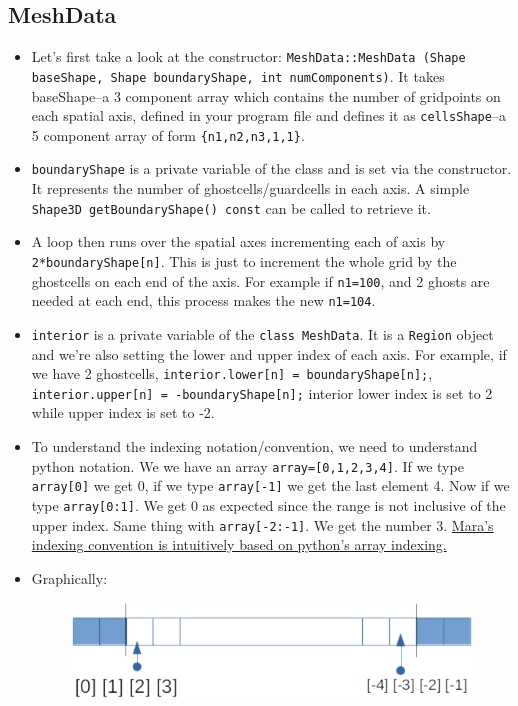 \documentclass{article}
\begin{document}
\subsection{MeshData}
\begin{itemize}
	\item Let's first take a look at the constructor: \texttt{MeshData::MeshData (Shape baseShape, Shape boundaryShape, int numComponents)}. It takes baseShape--a 3 component array which contains the number of gridpoints on each spatial axis, defined in your program file and defines it as \texttt{cellsShape}--a 5 component array of form \texttt{\{n1,n2,n3,1,1\}}.
	\item \texttt{boundaryShape} is a private variable of the class and is set via the constructor. It represents the number of ghostcells/guardcells in each axis. A simple \texttt{Shape3D getBoundaryShape() const} can be called to retrieve it.
	\item A loop then runs over the spatial axes incrementing each of axis by \texttt{2*boundaryShape[n]}. This is just to increment the whole grid by the ghostcells on each end of the axis. For example if \texttt{n1=100}, and 2 ghosts are needed at each end, this process makes the new \texttt{n1=104}.
	\item \texttt{interior} is a private variable of the \texttt{class MeshData}. It is a \texttt{Region} object and we're also setting the lower and upper index of each axis. For example, if we have 2 ghostcells, \texttt{interior.lower[n] =  boundaryShape[n];}, \texttt{interior.upper[n] = -boundaryShape[n];} interior lower index is set to 2 while upper index is set to -2.
	\item To understand the indexing notation/convention, we need to understand python notation. We we have an array \texttt{array=[0,1,2,3,4]}. If we type \texttt{array[0]} we get 0, if we  type \texttt{array[-1]} we get the last element 4. Now if we type \texttt{array[0:1]}. We get 0 as expected since the range is not inclusive of the upper index. Same thing with \texttt{array[-2:-1]}. We get the number 3. \underline{Mara's indexing convention is intuitively based on python's array indexing.}
	\item Graphically: 
	\begin{figure}[H]
		\includegraphics[scale=0.5]{./gridghost.png}

\end{figure}
\end{itemize}
\end{document}
